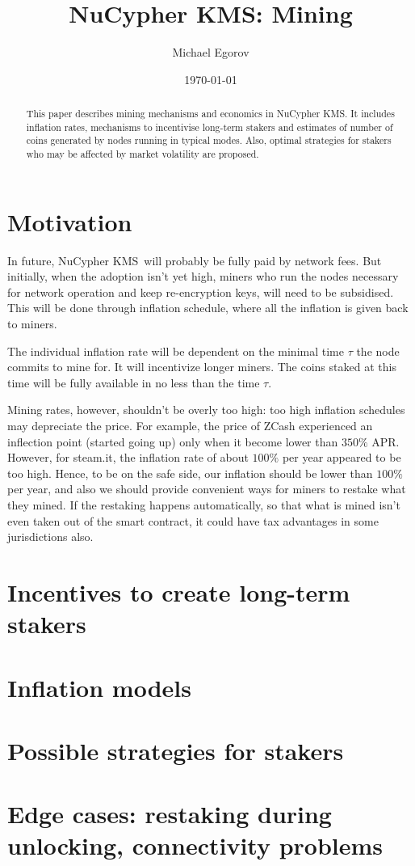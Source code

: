 \documentclass[longbibliography,nofootinbib,twocolumn]{revtex4-1}
\newcommand{\kms}{NuCypher KMS}
\begin{document}
\title{\kms: Mining}

\author{Michael Egorov}

\begin{abstract}
    This paper describes mining mechanisms and economics in \kms.
    It includes inflation rates, mechanisms to incentivise long-term stakers
    and estimates of number of coins generated by nodes running in typical modes.
    Also, optimal strategies for stakers who may be affected by market volatility are proposed.
\end{abstract}

\date{\today}
\maketitle

\section{Motivation}

In future, \kms~will probably be fully paid by network fees.
But initially, when the adoption isn't yet high, miners who run the nodes necessary for network operation and keep re-encryption keys,
will need to be subsidised.
This will be done through inflation schedule, where all the inflation is given back to miners.

The individual inflation rate will be dependent on the minimal time $\tau$ the node commits to mine for.
It will incentivize longer miners.
The coins staked at this time will be fully available in no less than the time $\tau$.

Mining rates, however, shouldn't be overly too high: too high inflation schedules may depreciate the price.
For example, the price of ZCash experienced an inflection point (started going up) only when it become lower than $350\%$ APR.
However, for steam.it, the inflation rate of about $100\%$ per year appeared to be too high.
Hence, to be on the safe side, our inflation should be lower than $100\%$ per year, and also we should provide convenient ways for miners to restake what they
mined.
If the restaking happens automatically, so that what is mined isn't even taken out of the smart contract, it could have tax advantages in some jurisdictions
also.

\section{Incentives to create long-term stakers}

\section{Inflation models}

\section{Possible strategies for stakers}

\section{Edge cases: restaking during unlocking, connectivity problems}
\end{document}
